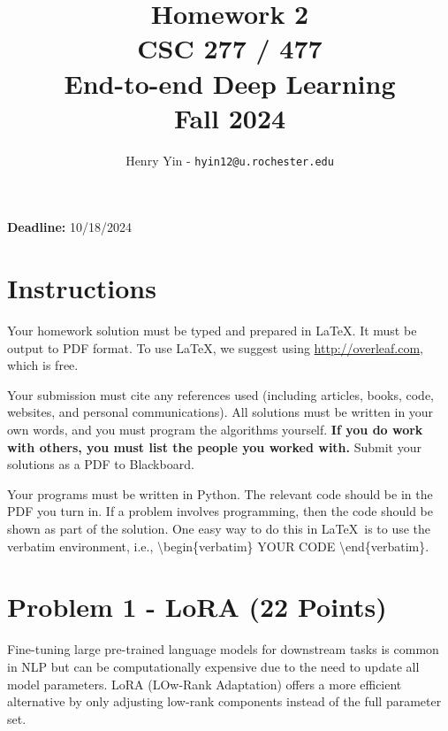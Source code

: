 \documentclass[11pt, oneside]{article}   	%
\title{Homework 2 \\ CSC 277 / 477 \\ End-to-end Deep Learning \\ Fall 2024}
\author{Henry Yin - \texttt{hyin12@u.rochester.edu}}
\date{}
\begin{document}
\maketitle

\begin{center}
    \textbf{Deadline:} 10/18/2024
\end{center}


\section*{Instructions}

Your homework solution must be typed and prepared in \LaTeX. It must be output to PDF format. To use \LaTeX, we suggest using \url{http://overleaf.com}, which is free.

Your submission must cite any references used (including articles, books, code, websites, and personal communications).  All solutions must be written in your own words, and you must program the algorithms yourself. \textbf{If you do work with others, you must list the people you worked with.} Submit your solutions as a PDF to Blackboard. 


Your programs must be written in Python. The relevant code should be in the PDF you turn in. If a problem involves programming, then the code should be shown as part of the solution. One easy way to do this in \LaTeX \, is to use the verbatim environment, i.e., \textbackslash begin\{verbatim\} YOUR CODE \textbackslash end\{verbatim\}.










\clearpage



\section*{Problem 1 - LoRA (22 Points)}
Fine-tuning large pre-trained language models for downstream tasks is common in NLP but can be computationally expensive due to the need to update all model parameters. LoRA (LOw-Rank Adaptation) offers a more efficient alternative by only adjusting low-rank components instead of the full parameter set.
\end{document}
